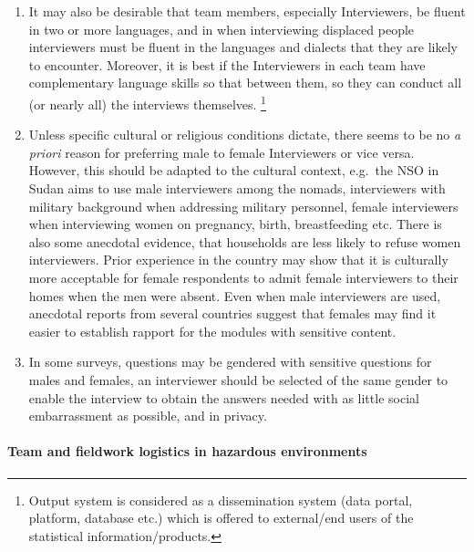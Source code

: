 \documentclass[
]{article}
\begin{document}
\begin{enumerate}
\def\labelenumi{\arabic{enumi}.}
\setcounter{enumi}{345}
\item
  It may also be desirable that team members, especially
  Interviewers, be fluent in two or more languages, and in when
  interviewing displaced people interviewers must be fluent in the
  languages and dialects that they are likely to encounter. Moreover,
  it is best if the Interviewers in each team have complementary
  language skills so that between them, so they can conduct all (or
  nearly all) the interviews themselves. \footnote{Output system is considered as a dissemination system (data
    portal, platform, database etc.) which is offered to external/end
    users of the statistical information/products.}
\item
  Unless specific cultural or religious conditions dictate, there
  seems to be no \emph{a priori} reason for preferring male to female
  Interviewers or vice versa. However, this should be adapted to the
  cultural context, e.g.~the NSO in Sudan aims to use male
  interviewers among the nomads, interviewers with military background
  when addressing military personnel, female interviewers when
  interviewing women on pregnancy, birth, breastfeeding etc. There is
  also some anecdotal evidence, that households are less likely to
  refuse women interviewers. Prior experience in the country may show
  that it is culturally more acceptable for female respondents to
  admit female interviewers to their homes when the men were absent.
  Even when male interviewers are used, anecdotal reports from several
  countries suggest that females may find it easier to establish
  rapport for the modules with sensitive content.
\item
  In some surveys, questions may be gendered with sensitive questions
  for males and females, an interviewer should be selected of the same
  gender to enable the interview to obtain the answers needed with as
  little social embarrassment as possible, and in privacy.
\end{enumerate}

\hypertarget{team-and-fieldwork-logistics-in-hazardous-environments-1}{%
\paragraph{Team and fieldwork logistics in hazardous environments}\label{team-and-fieldwork-logistics-in-hazardous-environments-1}}
\end{document}
